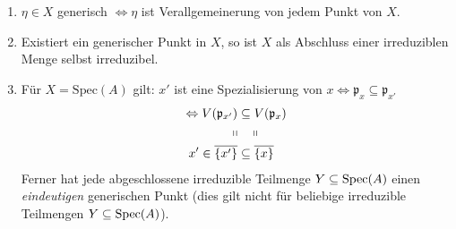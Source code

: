 \begin{rem}\mbox{}
\label{rem:eigenschaften-generische-punkte}	
  \begin{enumerate}
  \item $\eta\in X$ generisch $\Leftrightarrow\eta$ ist
    Verallgemeinerung von jedem Punkt von $X$.
  \item Existiert ein generischer Punkt in $X$, so ist $X$ als
    Abschluss einer irreduziblen Menge selbst irreduzibel.
  \item Für $X=\text{Spec}(A)$ gilt: $x'$ ist eine Spezialisierung von
    $x\Leftrightarrow\mathfrak{p}_{x}\subseteq\mathfrak{p}_{x'}$
    \begin{align*}
      \Leftrightarrow V(\mathfrak{p}_{x'}) & \subseteq V(\mathfrak{p}_{x})\\
      \shortparallel & \phantom{\subseteq\,}\shortparallel\\
      x'\in\overline{\{x'\}} & \subseteq\overline{\{x\}}
    \end{align*}
    Ferner hat jede abgeschlossene irreduzible Teilmenge
    $Y\subseteq \operatorname{Spec}(A)$ einen \emph{eindeutigen} generischen Punkt (dies
    gilt nicht für beliebige irreduzible Teilmengen
    $Y\subseteq\operatorname{Spec}(A)$).
  \end{enumerate}
\end{rem}
